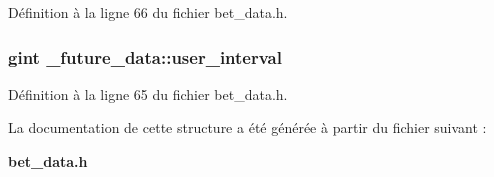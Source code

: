 Définition à la ligne 66 du fichier bet\_\-data.h.

\subsubsection[{user\_\-interval}]{\setlength{\rightskip}{0pt plus 5cm}gint {\bf \_\-future\_\-data::user\_\-interval}}\label{struct__future__data_a885f8205f201ed4d41e2929d875af157}


Définition à la ligne 65 du fichier bet\_\-data.h.



La documentation de cette structure a été générée à partir du fichier suivant :\begin{DoxyCompactItemize}
\item 
{\bf bet\_\-data.h}\end{DoxyCompactItemize}
